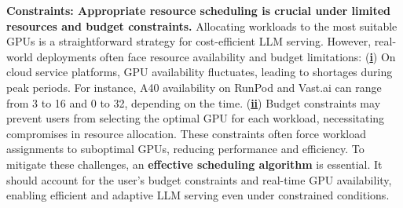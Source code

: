 
\textbf{Constraints: Appropriate resource scheduling is crucial under limited resources and budget constraints.}
Allocating workloads to the most suitable GPUs is a straightforward strategy for cost-efficient LLM serving. However, real-world deployments often face resource availability and budget limitations:
(\underline{\textbf{i}}) On cloud service platforms, GPU availability fluctuates, leading to shortages during peak periods. For instance, A40 availability on RunPod and Vast.ai can range from 3 to 16 and 0 to 32, depending on the time.
(\underline{\textbf{ii}}) Budget constraints may prevent users from selecting the optimal GPU for each workload, necessitating compromises in resource allocation.
These constraints often force workload assignments to suboptimal GPUs, reducing performance and efficiency. To mitigate these challenges, an \textbf{effective scheduling algorithm} is essential. It should account for the user’s budget constraints and real-time GPU availability, enabling efficient and adaptive LLM serving even under constrained conditions.

